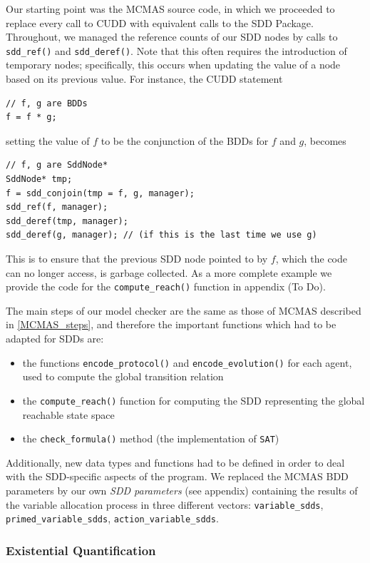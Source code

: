 \documentclass[11pt]{article}
\begin{document}
Our starting point was the MCMAS source code, in which we proceeded to replace every call to CUDD with equivalent calls to the SDD Package. Throughout, we managed the reference counts of our SDD nodes by calls to \texttt{sdd\_ref()} and 
\texttt{sdd\_deref()}. Note that this often requires the introduction of temporary nodes; specifically, this occurs when updating the value of a node based on its previous value. For instance, the CUDD statement 
\begin{verbatim}
// f, g are BDDs
f = f * g; 
\end{verbatim}
setting the value of $f$ to be the conjunction of the BDDs for $f$ and $g$, becomes
\begin{verbatim}
// f, g are SddNode*
SddNode* tmp;
f = sdd_conjoin(tmp = f, g, manager);
sdd_ref(f, manager);
sdd_deref(tmp, manager);
sdd_deref(g, manager); // (if this is the last time we use g)
\end{verbatim}
This is to ensure that the previous SDD node pointed to by $f$, which the code can no longer access, is garbage collected. As a more complete example we provide the code for the \texttt{compute\_reach()} function in appendix (To Do).

The main steps of our model checker are the same as those of MCMAS described in \ref{MCMAS_steps}, and therefore the important functions which had to be adapted for SDDs are: 
\begin{itemize}
\item the functions \texttt{encode\_protocol()}  and \texttt{encode\_evolution()} for each agent, used to compute the global transition relation
\item the \texttt{compute\_reach()} function for computing the SDD representing the global reachable state space
\item the \texttt{check\_formula()} method (the implementation of \texttt{SAT})
\end{itemize}

Additionally, new data types and functions had to be defined in order to deal with the SDD-specific aspects of the program. We replaced the MCMAS BDD parameters by our own \textit{SDD parameters} (see appendix) containing the results of the variable allocation process in three different vectors: \texttt{variable\_sdds}, \texttt{primed\_variable\_sdds}, \texttt{action\_variable\_sdds}.

\subsubsection{Existential Quantification}
\end{document}
